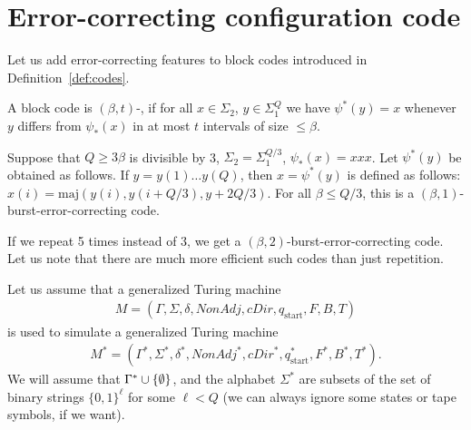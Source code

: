 \documentclass[12pt]{memoir}
\newcommand{\fld}[1]{\ensuremath{\textit{#1}}}
\newcommand{\maj}{\mathrm{maj}}
\def\B{B}
\newcommand{\Tu}{T}
\newcommand{\Tus}{T^{*}}
\newcommand{\Z}{Z}
\newcommand{\cDir}{\fld{cDir}}
\newcommand{\NonAdj}{\fld{NonAdj}}
\newcommand{\start}{\mathrm{start}}
\begin{document}



\section{Error-correcting configuration code}\label{sec:coding}

Let us add error-correcting features to block codes introduced in
Definition~\ref{def:codes}.

\begin{definition}\label{def:err-code}
A block code is \( (\beta,t) \)-,
if for all \( x\in\Sigma_{2} \), \( y\in\Sigma_{1}^{Q} \) we
have \( \psi^{*}(y)=x \) whenever \( y \) differs from
\( \psi_{*}(x) \) in at most \( t \) intervals of size \( \le\beta \).
\end{definition}

\begin{example}\label{xmp:tripling}
  Suppose that \( Q\ge 3\beta \) is divisible by 3,
  \( \Sigma_{2}=\Sigma_{1}^{Q/3} \), \( \psi_{*}(x)=xxx \).
  Let \( \psi^{*}(y) \) be obtained as follows.
  If \( y=y(1)\dots y(Q) \), then \( x=\psi^{*}(y) \) is defined as follows:
    \( x(i)=\maj(y(i),y(i+Q/3),y+2Q/3) \).
    For all \( \beta\le Q/3 \), this is a
    \( (\beta,1) \)-burst-error-correcting code.

    If we repeat 5 times instead of 3, we get a \( (\beta,2) \)-burst-error-correcting
    code.
    Let us note that there are much more efficient such codes than just repetition.
 \end{example}

Let us assume that a generalized Turing machine
\begin{align*}
    M = (\Gamma, \Sigma, \delta, \NonAdj, \cDir, q_{\start},F, \B, \Tu)
\end{align*}
is used to simulate a generalized Turing machine
\begin{align*}
M^* = (\Gamma^{*}, \Sigma^{*}, \delta^{*}, \NonAdj^{*}, \cDir^{*}, q^{*}_{\start},F^{*}, \B^{*}, \Tus).
\end{align*}
We will assume that \( \Gamma^*\cup\mathopen\{\emptyset\mathclose\} \),
and the alphabet \( \Sigma^* \) are subsets of the set of  binary strings
\( \{0,1\}^{\ell} \) for some \( \ell<Q \) (we can always ignore some states or tape
symbols, if we want).
\end{document}
